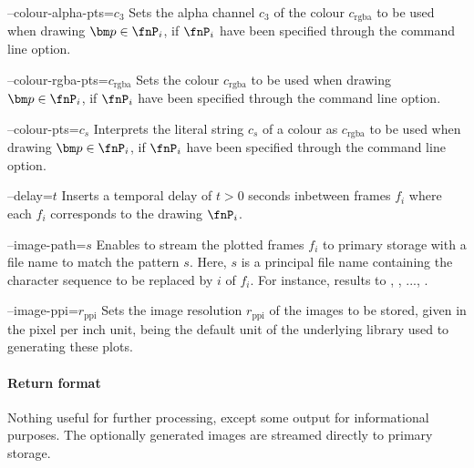 \begin{procarg}{--colour-alpha-pts=$c_3$}
  Sets the alpha channel $c_3$ of the colour $c_{\text{rgba}}$ to be used when drawing $\bm p \in \fnP_i$, if $\fnP_i$ have been specified through the command line option.
\end{procarg}

\begin{procarg}{--colour-rgba-pts=$c_{\text{rgba}}$}
  Sets the colour $c_{\text{rgba}}$ to be used when drawing $\bm p \in \fnP_i$, if $\fnP_i$ have been specified through the command line option.
\end{procarg}

\begin{procarg}{--colour-pts=$c_s$}
  Interprets the literal string $c_s$ of a colour as $c_{\text{rgba}}$ to be used when drawing $\bm p \in \fnP_i$, if $\fnP_i$ have been specified through the command line option.
\end{procarg}

\begin{procarg}{--delay=$t$}
  Inserts a temporal delay of $t > 0$ seconds inbetween frames $f_i$ where each $f_i$ corresponds to the drawing $\fnP_i$.
\end{procarg}

\begin{procarg}{--image-path=$s$}
  Enables to stream the plotted frames $f_i$ to primary storage with a file name to match the pattern $s$. Here, $s$ is a principal file name containing the character sequence  to be replaced by $i$ of $f_i$. For instance,  results to , , ..., .
\end{procarg}

\begin{procarg}{--image-ppi=$r_{\text{ppi}}$}
  Sets the image resolution $r_{\text{ppi}}$ of the images to be stored, given in the pixel per inch unit, being the default unit of the underlying library used to generating these plots.
\end{procarg}

\procargsilent


\paragraph{Return format}

Nothing useful for further processing, except some output for informational purposes. The optionally generated images are streamed directly to primary storage.
